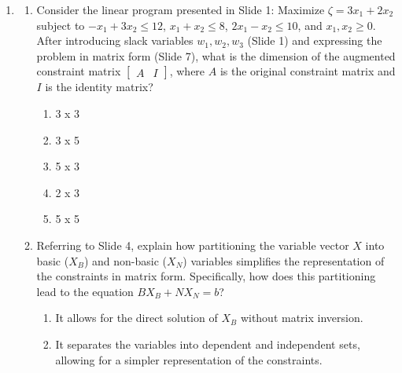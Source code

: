 \documentclass{article}%
\begin{document}
\begin{enumerate}
\begin{enumerate}%
\item The initial basic feasible solution is obtained by setting $X_B = B^{-1}b$ and $X_N = 0$.%
\item The initial basic feasible solution is obtained by setting $X_B = 0$ and $X_N = N^{-1}b$.%
\item The initial basic feasible solution is obtained by setting $X_B = b$ and $X_N = 0$.%
\item The initial basic feasible solution is obtained by setting $X_B = 0$ and $X_N = b$.%
\item The initial basic feasible solution cannot be determined from the given information.%
\end{enumerate}%
\vspace{1em}%
\item%
\begin{enumerate}%
\item Consider the linear program presented in Slide 1: Maximize $ \zeta = 3x_1 + 2x_2 $ subject to $ -x_1 + 3x_2 \le 12 $, $ x_1 + x_2 \le 8 $, $ 2x_1 - x_2 \le 10 $, and $ x_1, x_2 \ge 0 $. After introducing slack variables $ w_1, w_2, w_3 $ (Slide 1) and expressing the problem in matrix form (Slide 7), what is the dimension of the augmented constraint matrix $ \begin{bmatrix} A & I \end{bmatrix} $, where $ A $ is the original constraint matrix and $ I $ is the identity matrix?%
\begin{enumerate}%
\item 3 x 3%
\item 3 x 5%
\item 5 x 3%
\item 2 x 3%
\item 5 x 5%
\end{enumerate}%
\vspace{0.5em}%
\item Referring to Slide 4, explain how partitioning the variable vector $ X $ into basic ($ X_B $) and non-basic ($ X_N $) variables simplifies the representation of the constraints in matrix form.  Specifically, how does this partitioning lead to the equation $ BX_B + NX_N = b $?%
\begin{enumerate}%
\item It allows for the direct solution of $X_B$ without matrix inversion.%
\item It separates the variables into dependent and independent sets, allowing for a simpler representation of the constraints.%

\end{enumerate}
\end{enumerate}
\end{enumerate}
\end{document}
